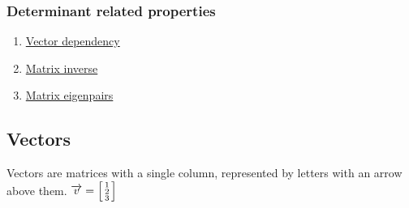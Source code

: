 \documentclass{article}
\begin{document}
\subsubsection{Determinant related properties}
\begin{enumerate}
    \item \hyperref[sec:dep]{Vector dependency}
    \item \hyperref[sec:inv]{Matrix inverse}
    \item \hyperref[sec:eigen]{Matrix eigenpairs}
\end{enumerate}


\subsection{Vectors}
Vectors are matrices with a single column, represented by letters with an arrow above them. $\overrightarrow{v} = \begin{bsmallmatrix}
    1\\2\\3
\end{bsmallmatrix}$
\end{document}
